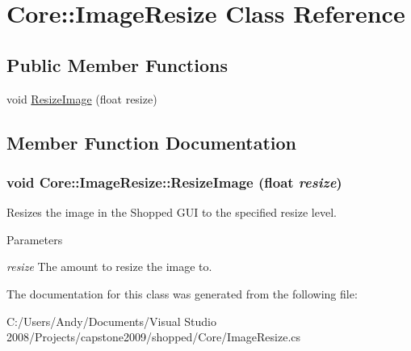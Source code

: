 \hypertarget{class_core_1_1_image_resize}{
\section{Core::ImageResize Class Reference}
\label{class_core_1_1_image_resize}
}
\subsection*{Public Member Functions}
\begin{DoxyCompactItemize}
\item 
void \hyperlink{class_core_1_1_image_resize_a11473ffbbb61eee829d30d3407431f67}{ResizeImage} (float resize)
\end{DoxyCompactItemize}


\subsection{Member Function Documentation}
\hypertarget{class_core_1_1_image_resize_a11473ffbbb61eee829d30d3407431f67}{
\subsubsection[{ResizeImage}]{\setlength{\rightskip}{0pt plus 5cm}void Core::ImageResize::ResizeImage (float {\em resize})}}
\label{class_core_1_1_image_resize_a11473ffbbb61eee829d30d3407431f67}
Resizes the image in the Shopped GUI to the specified resize level. 
\begin{DoxyParams}{Parameters}
\item[{\em resize}]The amount to resize the image to. \end{DoxyParams}


The documentation for this class was generated from the following file:\begin{DoxyCompactItemize}
\item 
C:/Users/Andy/Documents/Visual Studio 2008/Projects/capstone2009/shopped/Core/ImageResize.cs\end{DoxyCompactItemize}
